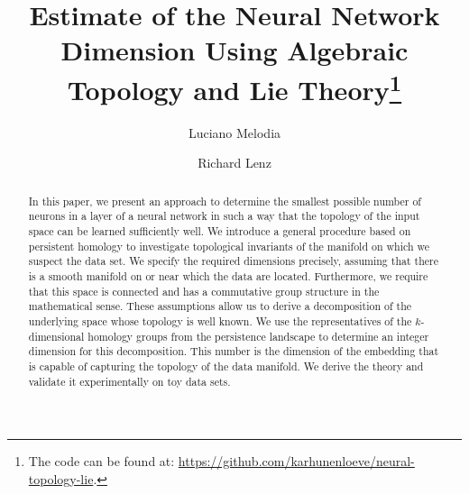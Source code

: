 \documentclass[runningheads,orivec]{llncs}
\begin{document}
%
\title{Estimate of the Neural Network Dimension Using Algebraic Topology and Lie Theory\thanks{The code can be found at: \href{https://github.com/karhunenloeve/neural-topology-lie}{https://github.com/karhunenloeve/neural-topology-lie}.}}
%
%

\author{Luciano Melodia \\
\and Richard Lenz}
%
%
%
\maketitle              %
%
\begin{abstract}
In this paper, we present an approach to determine the smallest possible number of neurons in a layer of a neural network in such a way that the topology of the input space can be learned sufficiently well. We introduce a general procedure based on persistent homology to investigate topological invariants of the manifold on which we suspect the data set. We specify the required dimensions precisely, assuming that there is a smooth manifold on or near which the data are located. Furthermore, we require that this space is connected and has a commutative group structure in the mathematical sense. These assumptions allow us to derive a decomposition of the underlying space whose topology is well known. We use the representatives of the $k$-dimensional homology groups from the persistence landscape to determine an integer dimension for this decomposition. This number is the dimension of the embedding that is capable of capturing the topology of the data manifold. We derive the theory and validate it experimentally on toy data sets. 

\end{abstract}
\end{document}
